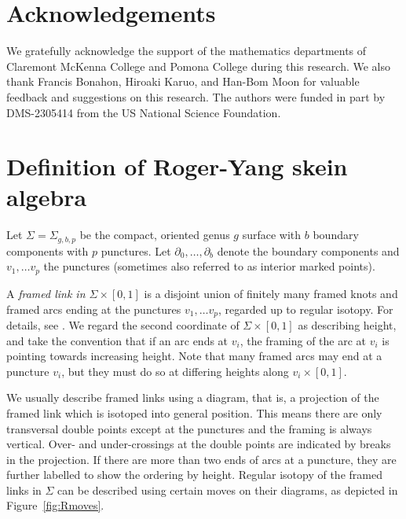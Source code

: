 \documentclass{article}
\newcommand{\del}{\partial}
\theoremstyle{definition}
\begin{document}
\section{Acknowledgements}
We gratefully acknowledge the support of the mathematics departments of  Claremont McKenna College and Pomona College during this research.  We also thank Francis Bonahon, Hiroaki Karuo, and Han-Bom Moon for valuable feedback and suggestions on this research.    The authors were funded in part by DMS-2305414 from the US National Science Foundation.


\section{Definition of Roger-Yang skein algebra}
Let $\Sigma=\Sigma_{g,b, p}$ be the compact, oriented genus $g$ surface with $b$ boundary components with $p$ punctures.  Let $\del_0, \ldots, \del_b$  denote the boundary components and $v_1, \ldots v_p $ the punctures (sometimes also referred to as interior marked points). 
 
A \emph{framed link in $\Sigma \times [0,1]$} is a disjoint union of finitely many framed knots and framed arcs ending at the punctures $v_1, \ldots v_p $, regarded up to regular isotopy. For details, see \cite{RogerYang}.   We regard  the second coordinate of $\Sigma \times [0,1]$ as describing height, and take the convention that if an arc ends at $v_i$, the framing of the arc at $v_i$ is pointing towards increasing height.    Note that many framed arcs may end at a puncture $v_i$, but they must do so at differing heights along $v_i \times[0,1]$.  

We usually describe framed links using a diagram, that is, a projection of the framed link which is isotoped into general position. This means there are only transversal double points except at the punctures and the framing is always vertical.  Over- and under-crossings at the double points are indicated by  breaks in the projection.  If there are more than two ends of arcs at a puncture, they are further labelled to show the ordering by height.  Regular isotopy of the framed links in $\Sigma$ can be described using certain moves on their diagrams, as depicted in Figure~\ref{fig:Rmoves}. 
\end{document}
